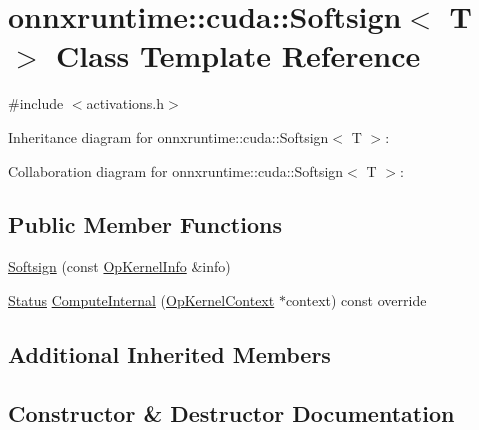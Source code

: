\hypertarget{classonnxruntime_1_1cuda_1_1Softsign}{}\section{onnxruntime\+:\+:cuda\+:\+:Softsign$<$ T $>$ Class Template Reference}
\label{classonnxruntime_1_1cuda_1_1Softsign}


{\ttfamily \#include $<$activations.\+h$>$}



Inheritance diagram for onnxruntime\+:\+:cuda\+:\+:Softsign$<$ T $>$\+:


Collaboration diagram for onnxruntime\+:\+:cuda\+:\+:Softsign$<$ T $>$\+:
\subsection*{Public Member Functions}
\begin{DoxyCompactItemize}
\item 
\mbox{\hyperlink{classonnxruntime_1_1cuda_1_1Softsign_ade4a36807e6face8714e034610d5e368}{Softsign}} (const \mbox{\hyperlink{classonnxruntime_1_1OpKernelInfo}{Op\+Kernel\+Info}} \&info)
\item 
\mbox{\hyperlink{classonnxruntime_1_1common_1_1Status}{Status}} \mbox{\hyperlink{classonnxruntime_1_1cuda_1_1Softsign_ac204135f17eff36f24431c9c9593f7e7}{Compute\+Internal}} (\mbox{\hyperlink{classonnxruntime_1_1OpKernelContext}{Op\+Kernel\+Context}} $\ast$context) const override
\end{DoxyCompactItemize}
\subsection*{Additional Inherited Members}


\subsection{Constructor \& Destructor Documentation}
\mbox{\label{classonnxruntime_1_1cuda_1_1Softsign_ade4a36807e6face8714e034610d5e368}} 
